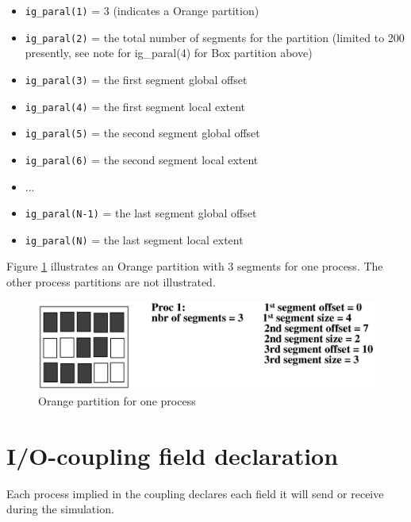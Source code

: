 \begin{itemize}
 \item {\tt ig\_paral(1)} = 3 (indicates a Orange partition)
 \item {\tt ig\_paral(2)} = the total number of segments for the partition (limited to 200 presently, see note for ig\_paral(4) for Box partition above)
 \item {\tt ig\_paral(3)} = the first segment global offset
 \item {\tt ig\_paral(4)} = the first segment local extent
 \item {\tt ig\_paral(5)} = the second segment global offset
 \item {\tt ig\_paral(6)} = the second segment local extent
 \item ...
 \item {\tt ig\_paral(N-1)} = the last segment global offset
 \item {\tt ig\_paral(N)} = the last segment local extent
\end{itemize}

Figure \ref{orange_partition} illustrates an Orange partition with 3 segments
for one process. The other process partitions are not illustrated.

\begin{figure}
\includegraphics[scale=.6]{orange_new.eps} 
\caption{Orange partition for one process}
\label{orange_partition}
\end{figure} 


\section{I/O-coupling field declaration}
 \label{subsubsec_Declaration}

Each process implied in the coupling declares each field it will send
or receive during the simulation. 

